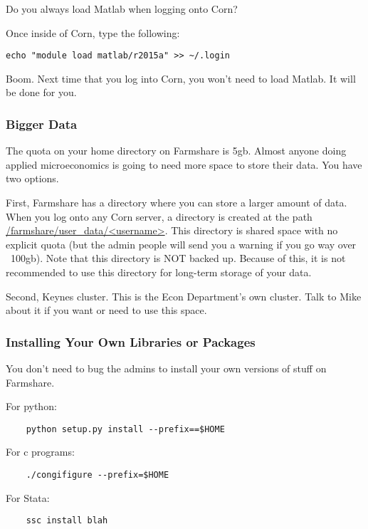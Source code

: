 \documentclass[12pt]{article}
\begin{document}
Do you always load Matlab when logging onto Corn?

Once inside of Corn, type the following:


\begin{lstlisting}
echo "module load matlab/r2015a" >> ~/.login
\end{lstlisting}

Boom. Next time that you log into Corn, you won't need to load Matlab. It will be done for you.

\subsubsection{Bigger Data}

The quota on your home directory on Farmshare is 5gb. Almost anyone doing applied microeconomics is going to need more space to store their data. You have two options.

First, Farmshare has a directory where you can store a larger amount of data. When you log onto any Corn server, a directory is created at the path \url{/farmshare/user_data/<username>}. This directory is shared space with no explicit quota (but the admin people will send you a warning if you go way over ~100gb). Note that this directory is NOT backed up. Because of this, it is not recommended to use this directory for long-term storage of your data.

Second, Keynes cluster. This is the Econ Department's own cluster. Talk to Mike about it if you want or need to use this space.

\subsubsection{Installing Your Own Libraries or Packages}

You don't need to bug the admins to install your own versions of stuff on Farmshare.

For python:

\begin{lstlisting}
	python setup.py install --prefix==$HOME
\end{lstlisting}


For c programs:

\begin{lstlisting}
	./congifigure --prefix=$HOME
\end{lstlisting}
	
For Stata:

\begin{lstlisting}
	ssc install blah
\end{lstlisting}
\end{document}
